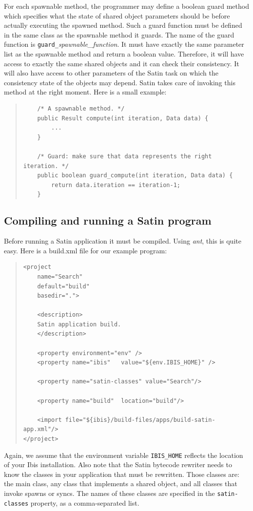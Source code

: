 \documentclass[10pt]{article}
\newcommand{\mysubsection}[1]{\subsection{#1}\label{#1}}
\begin{document}
For each spawnable method, the programmer may define a boolean guard
method which specifies what the state of shared object parameters should
be before actually executing the spawned method.
Such a guard function must be defined in the same class as the spawnable
method it guards.
The name of the guard function is
\texttt{guard\_}\textit{spawnable\_function}.
It must have exactly the same parameter list as the spawnable method
and return a boolean value.
Therefore, it will have access to exactly the same shared
objects and it can check their consistency.
It will also have access to other parameters of the Satin task on which the
consistency state of the objects may depend. 
Satin takes care of invoking this method at the right moment.
Here is a small example:

{\small
\begin{quote}
\begin{verbatim}
    /* A spawnable method. */
    public Result compute(int iteration, Data data) {
        ...
    }

    /* Guard: make sure that data represents the right iteration. */
    public boolean guard_compute(int iteration, Data data) {
        return data.iteration == iteration-1;
    }
\end{verbatim}
\end{quote}
}

\mysubsection{Compiling and running a Satin program}

Before running a Satin application it must be compiled.
Using \emph{ant}, this is quite easy. Here is a build.xml file for
our example program:

{\small
\begin{quote}
\begin{verbatim}
<project
    name="Search"
    default="build"
    basedir=".">

    <description>
    Satin application build.
    </description>

    <property environment="env" />
    <property name="ibis"   value="${env.IBIS_HOME}" />

    <property name="satin-classes" value="Search"/>

    <property name="build"  location="build"/>

    <import file="${ibis}/build-files/apps/build-satin-app.xml"/>
</project>
\end{verbatim}
\end{quote}
}

Again, we assume that the environment variable \texttt{IBIS\_HOME} reflects
the location of your Ibis installation.
Also note that the Satin bytecode rewriter needs to know the
classes in your application that must be rewritten.
Those classes are: the main class, any class that implements a shared object,
and all classes that invoke spawns or syncs.
The names of these classes are specified in the \texttt{satin-classes} property,
as a comma-separated list.
\end{document}
